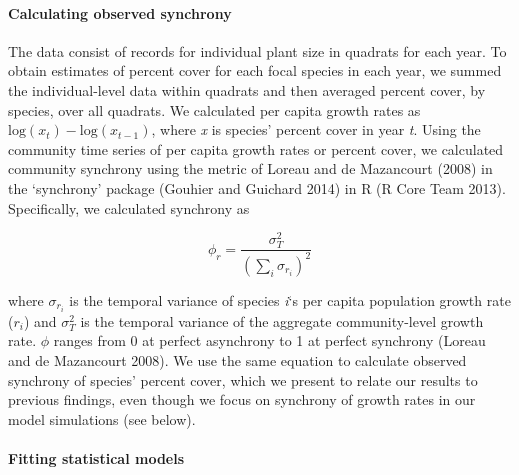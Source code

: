 \documentclass[12pt,]{article}
\begin{document}
\paragraph{Calculating observed
synchrony}\label{calculating-observed-synchrony}

The data consist of records for individual plant size in quadrats for
each year. To obtain estimates of percent cover for each focal species
in each year, we summed the individual-level data within quadrats and
then averaged percent cover, by species, over all quadrats. We
calculated per capita growth rates as
\(\text{log}(x_t) - \text{log}(x_{t-1})\), where \emph{x} is species'
percent cover in year \emph{t}. Using the community time series of per
capita growth rates or percent cover, we calculated community synchrony
using the metric of Loreau and {{de Mazancourt}} (2008) in the
`synchrony' package (Gouhier and Guichard 2014) in R (R Core Team 2013).
Specifically, we calculated synchrony as

\begin{equation}
\phi_r = \frac{\sigma^{2}_{T}}{(\sum_{i}\sigma_{r_{i}})^{2}}
\end{equation}

\noindent where \(\sigma_{r_{i}}\) is the temporal variance of species
\emph{i}`s per capita population growth rate (\(r_i\)) and
\(\sigma^{2}_{T}\) is the temporal variance of the aggregate
community-level growth rate. \(\phi\) ranges from 0 at perfect
asynchrony to 1 at perfect synchrony (Loreau and {{de Mazancourt}}
2008). We use the same equation to calculate observed synchrony of
species' percent cover, which we present to relate our results to
previous findings, even though we focus on synchrony of growth rates in
our model simulations (see below).

\paragraph{Fitting statistical models}\label{fitting-statistical-models}
\end{document}
